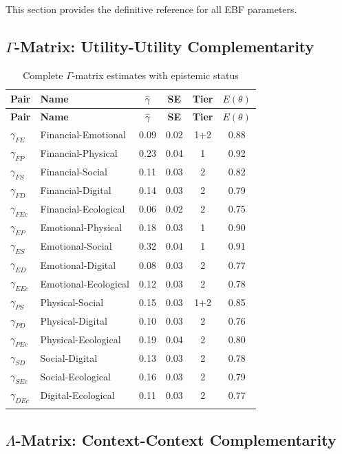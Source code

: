 \documentclass[11pt,a4paper]{article}
\theoremstyle{definition}
\begin{document}
This section provides the definitive reference for all EBF parameters.

\subsection{$\Gamma$-Matrix: Utility-Utility Complementarity}

\begin{longtable}{llcccc}
\toprule
\textbf{Pair} & \textbf{Name} & \textbf{$\hat{\gamma}$} & \textbf{SE} & \textbf{Tier} & $E(\theta)$ \\
\midrule
\endfirsthead
\toprule
\textbf{Pair} & \textbf{Name} & \textbf{$\hat{\gamma}$} & \textbf{SE} & \textbf{Tier} & $E(\theta)$ \\
\midrule
\endhead
$\gamma_{FE}$ & Financial-Emotional & 0.09 & 0.02 & 1+2 & 0.88 \\
$\gamma_{FP}$ & Financial-Physical & 0.23 & 0.04 & 1 & 0.92 \\
$\gamma_{FS}$ & Financial-Social & 0.11 & 0.03 & 2 & 0.82 \\
$\gamma_{FD}$ & Financial-Digital & 0.14 & 0.03 & 2 & 0.79 \\
$\gamma_{FEc}$ & Financial-Ecological & 0.06 & 0.02 & 2 & 0.75 \\
$\gamma_{EP}$ & Emotional-Physical & 0.18 & 0.03 & 1 & 0.90 \\
$\gamma_{ES}$ & Emotional-Social & 0.32 & 0.04 & 1 & 0.91 \\
$\gamma_{ED}$ & Emotional-Digital & 0.08 & 0.03 & 2 & 0.77 \\
$\gamma_{EEc}$ & Emotional-Ecological & 0.12 & 0.03 & 2 & 0.78 \\
$\gamma_{PS}$ & Physical-Social & 0.15 & 0.03 & 1+2 & 0.85 \\
$\gamma_{PD}$ & Physical-Digital & 0.10 & 0.03 & 2 & 0.76 \\
$\gamma_{PEc}$ & Physical-Ecological & 0.19 & 0.04 & 2 & 0.80 \\
$\gamma_{SD}$ & Social-Digital & 0.13 & 0.03 & 2 & 0.78 \\
$\gamma_{SEc}$ & Social-Ecological & 0.16 & 0.03 & 2 & 0.79 \\
$\gamma_{DEc}$ & Digital-Ecological & 0.11 & 0.03 & 2 & 0.77 \\
\bottomrule
\caption{Complete $\Gamma$-matrix estimates with epistemic status}
\label{tab:gamma-dictionary}
\end{longtable}

\subsection{$\Lambda$-Matrix: Context-Context Complementarity}
\end{document}
